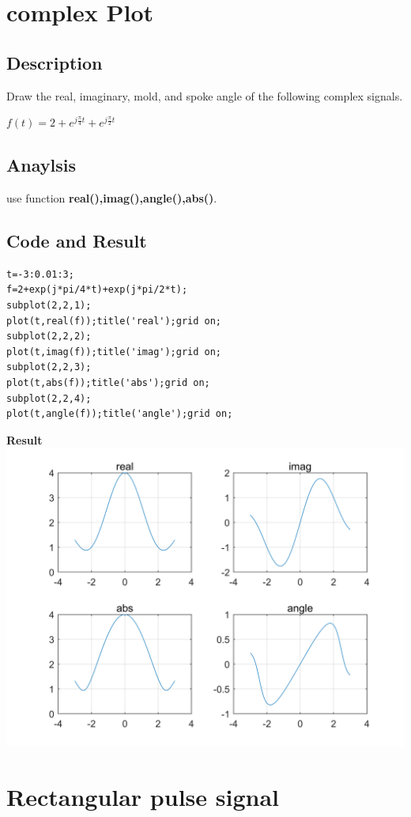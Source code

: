 \documentclass[UTF8,a4paper]{article}
\begin{document}
\section{complex Plot}
\subsection{Description}
Draw the real, imaginary, mold, and spoke angle of the following complex signals.
\begin{center}
$f(t)=2+e^{j\frac{\pi}{4}t}+e^{j\frac{\pi}{2}t}$
\end{center}
\subsection{Anaylsis}
\noindent use function \textbf{real(),imag(),angle(),abs()}.
\subsection{Code and Result}
\begin{lstlisting}
t=-3:0.01:3;
f=2+exp(j*pi/4*t)+exp(j*pi/2*t);
subplot(2,2,1);
plot(t,real(f));title('real');grid on;
subplot(2,2,2);
plot(t,imag(f));title('imag');grid on;
subplot(2,2,3);
plot(t,abs(f));title('abs');grid on;
subplot(2,2,4);
plot(t,angle(f));title('angle');grid on;           
\end{lstlisting}
\textbf{Result}\\
\includegraphics[scale=0.7]{2.png}\\

\section{Rectangular pulse signal}
\end{document}
